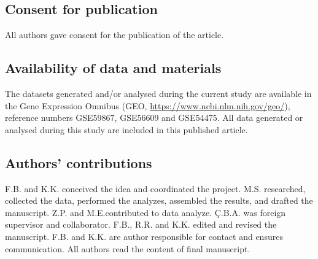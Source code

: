 \documentclass[sn-mathphys,Numbered]{sn-jnl}%
\theoremstyle{thmstyleone}%
\theoremstyle{thmstyletwo}%
\theoremstyle{thmstylethree}%
\begin{document}
\subsection*{Consent for publication}
All authors gave consent for the publication of the article.

\subsection*{Availability of data and materials}
The datasets generated and/or analysed during the current study are available in the Gene Expression Omnibus (GEO, \url{https://www.ncbi.nlm.nih.gov/geo/}), reference numbers GSE59867, GSE56609 and GSE54475. All data generated or analysed during this study are included in this published article.

\subsection*{Authors' contributions}

F.B. and K.K. conceived the idea and coordinated the project.
M.S. researched, collected the data, performed the analyzes, assembled the results, and drafted the manuscript.
Z.P. and M.E.contributed to data analyze.
Ç.B.A. was foreign supervisor and collaborator.
F.B., R.R. and K.K. edited and revised the manuscript.
F.B. and K.K. are author responsible for contact and ensures communication.
All authors read the content of final manuscript.
\end{document}
